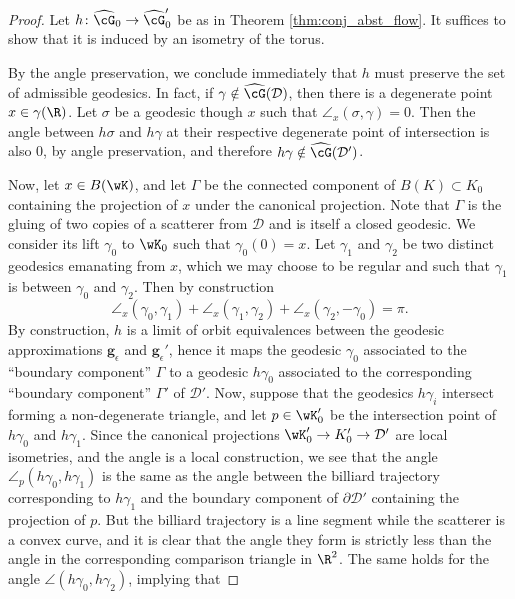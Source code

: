 \documentclass[reqno,11pt]{amsart}
\begin{document}
\begin{proof}
Let \(h\colon\widehat{\cG}_0 \to \widehat{\cG}_0'\) be as in Theorem \ref{thm:conj_abst_flow}.
It suffices to show that it is induced by an isometry of the torus.
\par By the angle preservation, we conclude immediately that \(h\) must preserve the set of admissible geodesics. 
In fact, if \(\gamma \notin \widehat{\cG}(\mathcal{D})\), then there is a degenerate point \(x \in \gamma(\R)\). 
Let \(\sigma\) be a geodesic though \(x\) such that \(\angle_x(\sigma, \gamma) = 0\). 
Then the angle between \(h\sigma\) and \(h\gamma\) at their respective degenerate point of intersection is also \(0\), by angle preservation, and therefore \(h\gamma \notin \widehat{\cG}(\mathcal{D}')\).
\par Now, let \(x \in B(\wK)\), and let \(\Gamma\) be the connected component of \(B(K) \subset K_0\) containing the projection of \(x\) under the canonical projection. Note that 
\(\Gamma\) is the gluing of two copies of a scatterer from \(\mathcal{D}\) and is itself a closed geodesic.
We consider its lift \(\gamma_0\) to \(\wK_0\) such that \(\gamma_0(0) = x\). 
Let \(\gamma_1\) and \(\gamma_2\) be two distinct geodesics emanating from \(x\), which we may choose to be regular and such that \(\gamma_1\) is between \(\gamma_0\) and \(\gamma_2\).
Then by construction
\[
    \angle_x(\gamma_0, \gamma_1) + \angle_x(\gamma_1, \gamma_2) + \angle_x(\gamma_2, -\gamma_0) = \pi.
\]
By construction, $h$ is a limit of orbit equivalences between the geodesic approximations $\mathbf{g}_\epsilon$ and $\mathbf{g}_\epsilon'$, hence it maps the geodesic $\gamma_0$ associated to the ``boundary component'' $\Gamma$ to a geodesic $h\gamma_0$ associated to the corresponding ``boundary component'' $\Gamma'$ of $\mathcal{D}'$.   
Now, suppose that the geodesics \(h\gamma_i\) intersect forming a non-degenerate triangle, and let \(p \in \wK_0'\) be the intersection point of \(h\gamma_0\) and \(h\gamma_1\).
Since the canonical projections \(\wK_0' \to K_0' \to \mathcal{D}'\) are local isometries, and the angle is a local construction, we see that the angle \(\angle_p(h\gamma_0, h\gamma_1)\) is the same as the angle between the billiard trajectory corresponding to \(h\gamma_1\) and the boundary component of \(\partial\mathcal{D}'\) containing the projection of \(p\).
But the billiard trajectory is a line segment while the scatterer is a convex curve, and it is clear that the angle they form is strictly less than the angle in the corresponding comparison triangle in \(\R^2\).
The same holds for the angle \(\angle(h\gamma_0, h\gamma_2)\), implying that

\end{proof}
\end{document}
